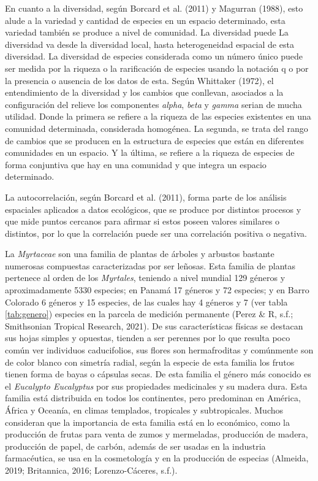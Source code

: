 \documentclass[11pt,]{article}
\begin{document}
En cuanto a la diversidad, según Borcard et al. (2011) y Magurran
(1988), esto alude a la variedad y cantidad de especies en un espacio
determinado, esta variedad también se produce a nivel de comunidad. La
diversidad puede La diversidad va desde la diversidad local, hasta
heterogeneidad espacial de esta diversidad. La diversidad de especies
considerada como un número único puede ser medida por la riqueza o la
rarificación de especies usando la notación q o por la presencia o
ausencia de los datos de esta. Según Whittaker (1972), el entendimiento
de la diversidad y los cambios que conllevan, asociados a la
configuración del relieve los componentes \emph{alpha}, \emph{beta} y
\emph{gamma} serian de mucha utilidad. Donde la primera se refiere a la
riqueza de las especies existentes en una comunidad determinada,
considerada homogénea. La segunda, se trata del rango de cambios que se
producen en la estructura de especies que están en diferentes
comunidades en un espacio. Y la última, se refiere a la riqueza de
especies de forma conjuntiva que hay en una comunidad y que integra un
espacio determinado.

La autocorrelación, según Borcard et al. (2011), forma parte de los
análisis espaciales aplicados a datos ecológicos, que se produce por
distintos procesos y que mide puntos cercanos para afirmar si estos
poseen valores similares o distintos, por lo que la correlación puede
ser una correlación positiva o negativa.

La \emph{Myrtaceae} son una familia de plantas de árboles y arbustos
bastante numerosas compuestas caracterizadas por ser leñosas. Esta
familia de plantas pertenece al orden de los \emph{Myrtales}, teniendo a
nivel mundial 129 géneros y aproximadamente 5330 especies; en Panamá 17
géneros y 72 especies; y en Barro Colorado 6 géneros y 15 especies, de
las cuales hay 4 géneros y 7 (ver tabla \ref{tab:genero}) especies en la
parcela de medición permanente (Perez \& R, s.f.; Smithsonian Tropical
Research, 2021). De sus características físicas se destacan sus hojas
simples y opuestas, tienden a ser perennes por lo que resulta poco común
ver individuos caducifolios, sus flores son hermafroditas y comúnmente
son de color blanco con simetría radial, según la especie de esta
familia los frutos tienen forma de bayas o cápsulas secas. De esta
familia el género más conocido es el \emph{Eucalypto Eucalyptus} por sus
propiedades medicinales y su madera dura. Esta familia está distribuida
en todos los continentes, pero predominan en América, África y Oceanía,
en climas templados, tropicales y subtropicales. Muchos consideran que
la importancia de esta familia está en lo económico, como la producción
de frutas para venta de zumos y mermeladas, producción de madera,
producción de papel, de carbón, además de ser usadas en la industria
farmacéutica, se usa en la cosmetología y en la producción de especias
(Almeida, 2019; Britannica, 2016; Lorenzo-Cáceres, s.f.).
\end{document}

